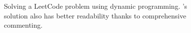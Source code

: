 \begin{figure}[H]
\begin{AIbox}{\DV}

\end{AIbox}
\caption{Solving a LeetCode problem using dynamic programming. \DV's solution also has better readability thanks to comprehensive commenting.}
\label{fig:leetcode}
\end{figure}


